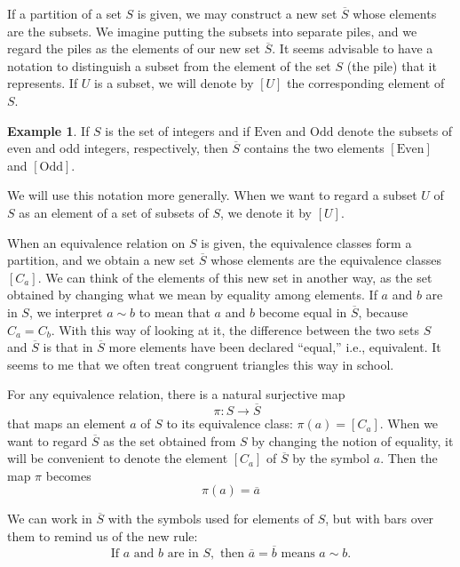 \documentclass[
]{book}
\theoremstyle{definition}
\theoremstyle{definition}
\newtheorem{example}{Example}[chapter]
\theoremstyle{definition}
\theoremstyle{definition}
\theoremstyle{remark}
\begin{document}
If a partition of a set \(S\) is given, we may construct a new set \(\overline{S}\) whose elements are the subsets. We imagine putting the subsets into separate piles, and we regard the piles as the elements of our new set \(\overline{S}\). It seems advisable to have a notation to distinguish a subset from the element of the set \(S\) (the pile) that it represents. If \(U\) is a subset, we will denote by \([U]\) the corresponding element of \(S\).

\begin{example}
\protect\hypertarget{exm:unnamed-chunk-36}{}\label{exm:unnamed-chunk-36}If \(S\) is the set of integers and if \(\text{Even}\) and \(\text{Odd}\) denote the subsets of even and odd integers, respectively, then \(\overline{S}\) contains the two elements \([\text{Even}]\) and \([\text{Odd}]\).
\end{example}

We will use this notation more generally. When we want to regard a subset \(U\) of \(S\) as an element of a set of subsets of \(S\), we denote it by \([U]\).

When an equivalence relation on \(S\) is given, the equivalence classes form a partition, and we obtain a new set \(\overline{S}\) whose elements are the equivalence classes \([C_a]\). We can think of the elements of this new set in another way, as the set obtained by changing what we mean by equality among elements. If \(a\) and \(b\) are in \(S\), we interpret \(a \sim b\) to mean that \(a\) and \(b\) become equal in \(\overline{S}\), because \(C_a = C_b\). With this way of looking at it, the difference between the two sets \(S\) and \(\overline{S}\) is that in \(\overline{S}\) more elements have been declared ``equal,'' i.e., equivalent. It seems to me that we often treat congruent triangles this way in school.

For any equivalence relation, there is a natural surjective map
\begin{equation}
 \quad \pi : S \to \overline{S}
\end{equation}
that maps an element \(a\) of \(S\) to its equivalence class: \(\pi(a) = [C_a]\). When we want to regard \(\overline{S}\) as the set obtained from \(S\) by changing the notion of equality, it will be convenient to denote the element \([C_a]\) of \(\overline{S}\) by the symbol \(a\). Then the map \(\pi\) becomes
\begin{equation}
\pi(a) = \overline{a}
\end{equation}

We can work in \(\overline{S}\) with the symbols used for elements of \(S\), but with bars over them to remind us of the new rule:
\begin{equation}
\text{If } a \text{ and } b \text{ are in } S, \text{ then } \overline{a} = \overline{b} \text{ means } a \sim b.
\end{equation}
\end{document}

